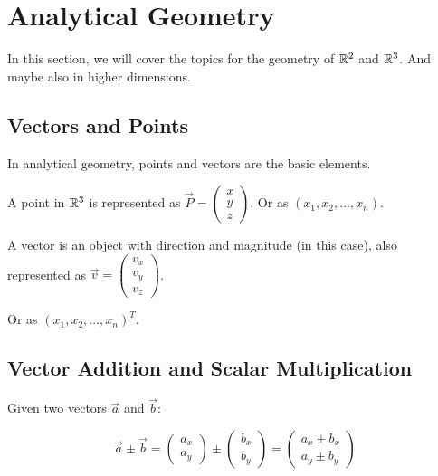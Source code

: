 \newpage
\section{Analytical Geometry}

In this section, we will cover the topics for the geometry of \(\mathbb{R}^2\) and \(\mathbb{R}^3\).
And maybe also in higher dimensions.

\subsection{Vectors and Points}

In analytical geometry, points and vectors are the basic elements.
\vspace{\baselineskip}

A point in \(\mathbb{R}^3\) is represented as \(\vec{P} = \begin{pmatrix} x \\ y \\ z \end{pmatrix}\).
Or as \((x_1, x_2, \dots , x_n)\).
\vspace{\baselineskip}

A vector is an object with direction and magnitude (in this case), also represented as \(\vec{v} = \begin{pmatrix} v_x \\ v_y \\ v_z \end{pmatrix}\).
\vspace{\baselineskip}

Or as \({(x_1, x_2, \dots , x_n)}^{T}\).

\subsection{Vector Addition and Scalar Multiplication}

Given two vectors \(\vec{a}\) and \(\vec{b}\):

\[
	\vec{a} \pm  \vec{b} = \begin{pmatrix} a_x \\ a_y \end{pmatrix} \pm \begin{pmatrix} b_x \\ b_y \end{pmatrix} = \begin{pmatrix} a_x \pm b_x \\ a_y \pm b_y \end{pmatrix}
\]

